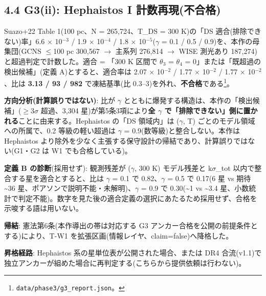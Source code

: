 \documentclass[11pt]{article}
\begin{document}
\subsection*{4.4 G3(ii): Hephaistos I 計数再現(不合格)}
\noindent Suazo+22 Table 1(100 pc、N = 265,724、T\_DS = 300 K)の「DS 適合(排除できない)率」6.6 \(\times\) 10\(^{-3}\) / 1.9 \(\times\) 10\(^{-4}\) / 1.8 \(\times\) 10\(^{-5}\)(\(\gamma\) = 0.1 / 0.5 / 0.9)を、本作の母集団(GCNS \(\leq\)100 pc 300,567 \(\rightarrow\) 主系列 276,814 \(\rightarrow\) WISE 測光あり 187,274)と超過判定で計数した。適合 = 「300 K 区間で \(\theta\)\(_{3}\) = \(\theta\)\(_{4}\) = 0」または「既超過の検出候補」(定義 A)とすると、適合率は 2.07 \(\times\) 10\(^{-2}\) / 1.77 \(\times\) 10\(^{-2}\) / 1.77 \(\times\) 10\(^{-2}\)、比は \textbf{3.13 / 93 / 982} で凍結基準(比 0.3–3)を外れ、\textbf{不合格}である\footnote{\texttt{data/phase3/g3\_report.json}。}。\par\smallskip
\noindent \textbf{方向分析(計算誤りではない)}: 比が \(\gamma\) とともに爆発する構造は、本作の「検出候補」(\(\geq\)3\(\sigma\) 超過、3,304 星)が第5条3項により\textbf{全 \(\gamma\) で「排除できない」側に置かれる}ことに由来する。Hephaistos の「DS 領域内」は (\(\gamma\), T) ごとのモデル領域への所属で、0.2 等級の軽い超過は \(\gamma\) = 0.9(数等級)と整合しない。本作は Hephaistos より除外を少なく主張する保守設計の帰結であり、計算誤りではない(G1・G2 は W1 でも合格している)。\par\smallskip
\noindent \textbf{定義 B の診断}(採用せず): 観測残差が (\(\gamma\), 300 K) モデル残差と k\(\sigma\)\_tot 以内で整合する星を適合とすると、比は \(\gamma\) = 0.1 で 0.82、\(\gamma\) = 0.5 で 0.17(6 星 vs 期待 \textasciitilde{}36 星、ポアソンで説明不能・未解明)、\(\gamma\) = 0.9 で 0.30(\textasciitilde{}1 vs \textasciitilde{}3.4 星、小数統計で判定不能)。数字を見た後の適合定義の選択にあたるため採用せず、合格を示唆する語は用いない。\par\smallskip
\noindent \textbf{帰結}: 憲法第6条(本作導出の帯は対応する G3 アンカー合格を公開の前提条件とする)により、T-W1 を拡張区画(情報レイヤ、claim=false)へ降格した。\par\smallskip
\noindent \textbf{昇格経路}: Hephaistos 系の星単位表が公開された場合、または DR4 合流(v1.1)で独立アンカーが組めた場合に再判定する(こちらから提供依頼は行わない)。\par\smallskip
\end{document}
